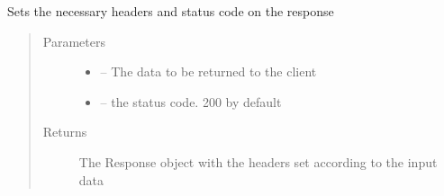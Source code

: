 \documentclass[letterpaper,10pt,english]{sphinxmanual}
\begin{document}

\begin{fulllineitems}
\label{_source/son_editor.util:son_editor.util.requestutil.prepare_response}
Sets the necessary headers and status code on the response
\begin{quote}\begin{description}
\item[{Parameters}] \leavevmode\begin{itemize}
\item {} 
 -- The data to be returned to the client

\item {} 
 -- the status code. 200 by default

\end{itemize}

\item[{Returns}] \leavevmode
The Response object with the headers set according to the input data

\end{description}\end{quote}

\end{fulllineitems}

\end{document}
